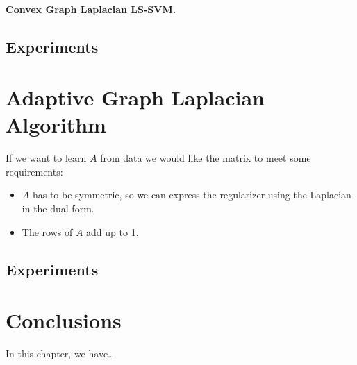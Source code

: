 \paragraph*{Convex Graph Laplacian LS-SVM.\\}




\subsection{Experiments}

\section{Adaptive Graph Laplacian Algorithm}

If we want to learn $A$ from data we would like the matrix to meet some requirements:
\begin{itemize}
    \item $A$ has to be symmetric, so we can express the regularizer using the Laplacian in the dual form.
    \item The rows of $A$ add up to 1. 
\end{itemize} 

\subsection{Experiments}



\section{Conclusions}\label{sec-conclusions-4}

In this chapter, we have\dots
